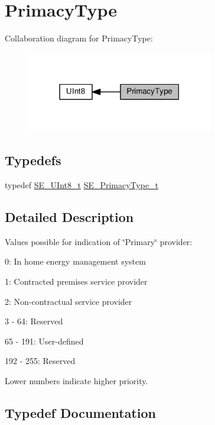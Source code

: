 \hypertarget{group__PrimacyType}{}\section{Primacy\+Type}
\label{group__PrimacyType}
Collaboration diagram for Primacy\+Type\+:\nopagebreak
\begin{figure}[H]
\begin{center}
\leavevmode
\includegraphics[width=231pt]{group__PrimacyType}
\end{center}
\end{figure}
\subsection*{Typedefs}
\begin{DoxyCompactItemize}
\item 
typedef \hyperlink{group__UInt8_gaf7c365a1acfe204e3a67c16ed44572f5}{S\+E\+\_\+\+U\+Int8\+\_\+t} \hyperlink{group__PrimacyType_ga484b22ef8ff92c8801e6a8b7bd8351eb}{S\+E\+\_\+\+Primacy\+Type\+\_\+t}
\end{DoxyCompactItemize}


\subsection{Detailed Description}
Values possible for indication of \char`\"{}\+Primary\char`\"{} provider\+:

0\+: In home energy management system

1\+: Contracted premises service provider

2\+: Non-\/contractual service provider

3 -\/ 64\+: Reserved

65 -\/ 191\+: User-\/defined

192 -\/ 255\+: Reserved

Lower numbers indicate higher priority. 

\subsection{Typedef Documentation}
\mbox{\label{group__PrimacyType_ga484b22ef8ff92c8801e6a8b7bd8351eb}} 
